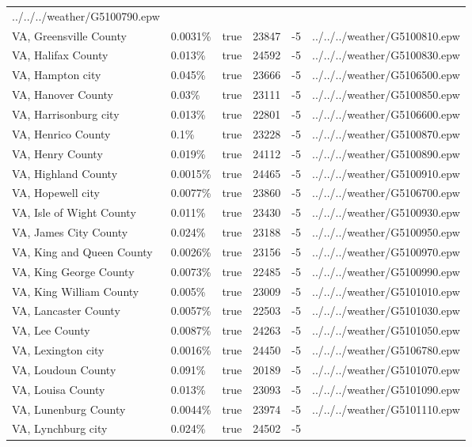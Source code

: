 \begin{longtable}[]{@{}llllll@{}}
../../../weather/G5100790.epw \\
VA, Greensville County & 0.0031\% & true & 23847 & -5 &
../../../weather/G5100810.epw \\
VA, Halifax County & 0.013\% & true & 24592 & -5 &
../../../weather/G5100830.epw \\
VA, Hampton city & 0.045\% & true & 23666 & -5 &
../../../weather/G5106500.epw \\
VA, Hanover County & 0.03\% & true & 23111 & -5 &
../../../weather/G5100850.epw \\
VA, Harrisonburg city & 0.013\% & true & 22801 & -5 &
../../../weather/G5106600.epw \\
VA, Henrico County & 0.1\% & true & 23228 & -5 &
../../../weather/G5100870.epw \\
VA, Henry County & 0.019\% & true & 24112 & -5 &
../../../weather/G5100890.epw \\
VA, Highland County & 0.0015\% & true & 24465 & -5 &
../../../weather/G5100910.epw \\
VA, Hopewell city & 0.0077\% & true & 23860 & -5 &
../../../weather/G5106700.epw \\
VA, Isle of Wight County & 0.011\% & true & 23430 & -5 &
../../../weather/G5100930.epw \\
VA, James City County & 0.024\% & true & 23188 & -5 &
../../../weather/G5100950.epw \\
VA, King and Queen County & 0.0026\% & true & 23156 & -5 &
../../../weather/G5100970.epw \\
VA, King George County & 0.0073\% & true & 22485 & -5 &
../../../weather/G5100990.epw \\
VA, King William County & 0.005\% & true & 23009 & -5 &
../../../weather/G5101010.epw \\
VA, Lancaster County & 0.0057\% & true & 22503 & -5 &
../../../weather/G5101030.epw \\
VA, Lee County & 0.0087\% & true & 24263 & -5 &
../../../weather/G5101050.epw \\
VA, Lexington city & 0.0016\% & true & 24450 & -5 &
../../../weather/G5106780.epw \\
VA, Loudoun County & 0.091\% & true & 20189 & -5 &
../../../weather/G5101070.epw \\
VA, Louisa County & 0.013\% & true & 23093 & -5 &
../../../weather/G5101090.epw \\
VA, Lunenburg County & 0.0044\% & true & 23974 & -5 &
../../../weather/G5101110.epw \\
VA, Lynchburg city & 0.024\% & true & 24502 & -5 &

\end{longtable}
